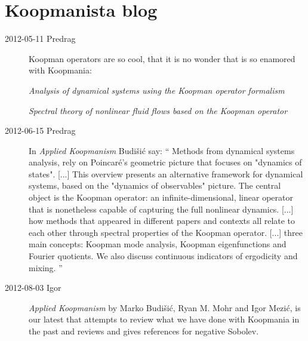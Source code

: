 \section{Koopmanista blog}

\begin{description}

\item[2012-05-11 Predrag]                       \toCB
Koopman operators are so cool, that it is no wonder that
 is
so enamored with Koopmania:

{\em Analysis of dynamical systems using the
{Koopman operator formalism}}

{\em Spectral theory of nonlinear fluid flows based on the
{Koopman operator}}

\item[2012-06-15 Predrag]
In {\em Applied Koopmanism} Budi{\v s}i{\'c}\etal{} say: ``
Methods from dynamical systems analysis, rely on Poincar\'e's geometric
picture that focuses on "dynamics of states". [...] This overview
presents an alternative framework for dynamical systems, based on the
"dynamics of observables" picture. The central object is the Koopman
operator: an infinite-dimensional, linear operator that is nonetheless
capable of capturing the full nonlinear dynamics. [...]  how methods that
appeared in different papers and contexts all relate to each other
through spectral properties of the Koopman operator.  [...] three main
concepts: Koopman mode analysis, Koopman eigenfunctions and Fourier
quotients. We also discuss continuous indicators of ergodicity and
mixing.
''

\item[2012-08-03 Igor]
\emph{Applied Koopmanism} by Marko Budi\v{s}i\'c, Ryan M. Mohr and Igor
Mezi\'c,  is our latest that attempts to review what we
have done with Koopmania in the past and reviews and gives references for
negative Sobolev.


\end{description}
